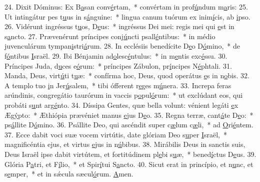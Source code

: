 24. Dixit Dóminus: Ex B\uline{a}san conv\uline{é}rtam,~* convértam in prof\uline{ú}ndum m\uline{a}ris:
25. Ut intingátur pes t\uline{u}us in s\uline{á}nguine:~* lingua canum tuórum ex inim\uline{í}cis, ab \uline{i}pso.
26. Vidérunt ingréssus t\uline{u}os, D\uline{e}us:~* ingréssus Dei mei: regis mei qui \uline{e}st in s\uline{a}ncto.
27. Prævenérunt príncipes conj\uline{ú}ncti psall\uline{é}ntibus:~* in médio juvenculárum tympan\uline{i}stri\uline{á}rum.
28. In ecclésiis benedícite D\uline{e}o D\uline{ó}mino,~* de f\uline{ó}ntibus \uline{I}sraël.
29. Ibi Bénjamin ad\uline{o}lesc\uline{é}ntulus:~* in m\uline{e}ntis exc\uline{é}ssu.
30. Príncipes Juda, d\uline{u}ces e\uline{ó}rum:~* príncipes Zábulon, pr\uline{í}ncipes N\uline{é}phtali.
31. Manda, Deus, virt\uline{ú}ti t\uline{u}æ:~* confírma hoc, Deus, quod operátus \uline{e}s in n\uline{o}bis.
32. A templo tuo \uline{i}n Jer\uline{ú}salem,~* tibi ófferent r\uline{e}ges m\uline{ú}nera.
33. Increpa feras arúndinis, congregátio taurórum in vaccis p\uline{o}pul\uline{ó}rum:~* ut exclúdant eos, qui probáti s\uline{u}nt arg\uline{é}nto.
34. Díssipa Gentes, quæ bella volunt: vénient legáti \uline{e}x Æg\uline{ý}pto:~* Æthiópia prævéniet manus \uline{e}jus D\uline{e}o.
35. Regna terræ, cant\uline{á}te D\uline{e}o:~* ps\uline{á}llite D\uline{ó}mino.
36. Psállite Deo, qui ascéndit super c\uline{æ}lum c\uline{æ}li,~* ad \uline{O}ri\uline{é}ntem.
37. Ecce dabit voci suæ vocem virtútis, date glóriam Deo s\uline{u}per \uline{I}sraël,~* magnificéntia ejus, et virtus \uline{e}jus in n\uline{ú}bibus.
38. Mirábilis Deus in sanctis suis, Deus Israël ipse dabit virtútem, et fortitúdinem pl\uline{e}bi s\uline{u}æ,~* bened\uline{í}ctus D\uline{e}us.
39. Glória P\uline{a}tri, et F\uline{í}lio,~* et Spir\uline{í}tui S\uline{a}ncto.
40. Sicut erat in princípio, et n\uline{u}nc, et s\uline{e}mper,~* et in sǽcula sæcul\uline{ó}rum. \uline{A}men.
